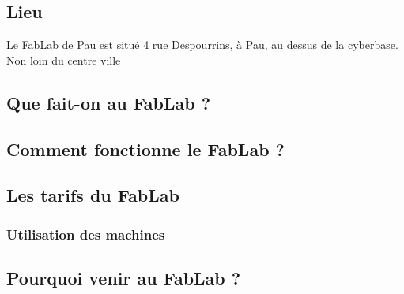 \subsection{Lieu}
Le FabLab de Pau est situé 4 rue Despourrins, à Pau, au dessus de la cyberbase. Non loin du centre ville
\subsection{Que fait-on au FabLab ?}
\subsection{Comment fonctionne le FabLab ?}

\subsection{Les tarifs du FabLab}

\subsubsection{Utilisation des machines}

\subsection{Pourquoi venir au FabLab ?}
